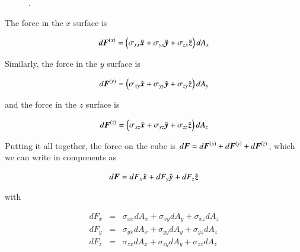 \begin{figure}
  \begin{center}
  \end{center}
  \caption[]{.}
  \label{fig:tensor11}
\end{figure}

The force in the $x$ surface is 

\begin{equation}
d{\boldsymbol{F}}^{(x)} =\left( \sigma_{xx} \hat{{\boldsymbol{x}}} + \sigma_{yx} \hat{{\boldsymbol{y}}} + \sigma_{zx}\hat{{\boldsymbol{z}}}  \right) dA_x
\end{equation}

Similarly, the force in the $y$ surface is 


\begin{equation}
d{\boldsymbol{F}}^{(y)} =\left( \sigma_{xy} \hat{{\boldsymbol{x}}} + \sigma_{yy} \hat{{\boldsymbol{y}}} + \sigma_{zy}\hat{{\boldsymbol{z}}}  \right) dA_y
\end{equation}

and the force in the $z$ surface is 

\begin{equation}
d{\boldsymbol{F}}^{(z)} =\left( \sigma_{xz} \hat{{\boldsymbol{x}}} + \sigma_{yz} \hat{{\boldsymbol{y}}} + \sigma_{zz}\hat{{\boldsymbol{z}}}  \right) dA_z
\end{equation}



Putting it all together, the force on the cube is  $d{\boldsymbol{F}} = d{\boldsymbol{F}}^{(x)} + d{\boldsymbol{F}}^{(y)} + d{\boldsymbol{F}}^{(z)}$, which we can write in components as  

\begin{equation}
d{\boldsymbol{F}} = dF_x \hat{{\boldsymbol{x}}} + dF_y \hat{{\boldsymbol{y}}} + dF_z \hat{{\boldsymbol{z}}}
\end{equation}

\noindent with 

\begin{eqnarray}
dF_x &=& \sigma_{xx}dA_x + \sigma_{xy}dA_y + \sigma_{xz}dA_z \\
dF_y &=& \sigma_{yx}dA_x + \sigma_{yy}dA_y + \sigma_{yz}dA_z \\
dF_z &=& \sigma_{zx}dA_x + \sigma_{zy}dA_y + \sigma_{zz}dA_z 
\end{eqnarray}

